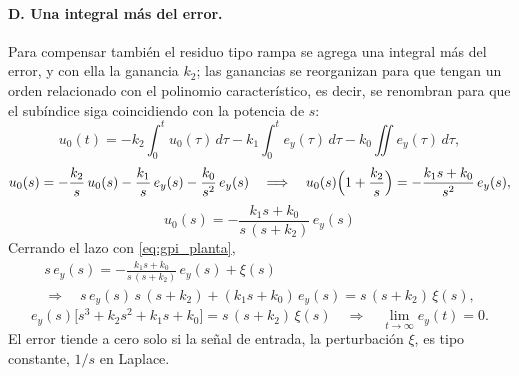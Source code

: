 \paragraph{D. Una integral más del error.} Para compensar
también el residuo tipo rampa se agrega una integral más del error, y con ella la
ganancia $k_2$; las ganancias se reorganizan para que tengan un orden relacionado con el
polinomio característico, es decir, se renombran para que el subíndice siga coincidiendo
con la potencia de $s$:
\begin{equation}
u_0(t) = -k_2\!\int_0^t\! u_0(\tau)\,d\tau - k_1\!\int_0^t\! e_y(\tau)\,d\tau
- k_0\!\iint e_y(\tau)\,d\tau ,
\label{eq:gpi_integrales}
\end{equation}
\begin{equation}
u_0(s) = -\frac{k_2}{s}\,u_0(s) - \frac{k_1}{s}\,e_y(s) - \frac{k_0}{s^2}\,e_y(s)
\quad\Longrightarrow\quad
u_0(s)\Bigl(1 + \frac{k_2}{s}\Bigr) = -\frac{k_1 s + k_0}{s^2}\,e_y(s) ,
\end{equation}
\begin{equation}
\boxed{\;u_0(s) = -\frac{k_1 s + k_0}{s\,(s + k_2)}\,e_y(s)\;}
\label{eq:gpi_ley}
\end{equation}
Cerrando el lazo con \eqref{eq:gpi_planta},
\begin{equation}
\begin{gathered}
s\,e_y(s) = -\frac{k_1 s + k_0}{s\,(s + k_2)}\,e_y(s) + \xi(s) \\
\Longrightarrow\quad
s\,e_y(s)\,s\,(s + k_2) + (k_1 s + k_0)\,e_y(s) = s\,(s + k_2)\,\xi(s) ,
\end{gathered}
\end{equation}
\begin{equation}
e_y(s)\bigl[s^3 + k_2 s^2 + k_1 s + k_0\bigr] = s\,(s + k_2)\,\xi(s)
\quad\Longrightarrow\quad
\lim_{t\to\infty} e_y(t) = 0 .
\label{eq:gpi_cerrado}
\end{equation}
El error tiende a cero solo si la señal de entrada, la perturbación $\xi$, es tipo constante, $1/s$
en Laplace.

